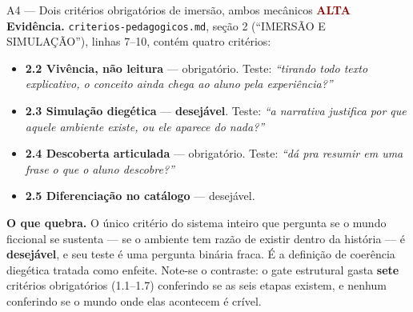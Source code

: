 \documentclass[11pt,a4paper]{article}
\newcommand{\sevalta}{\textcolor{DarkRed}{\textbf{ALTA}}}
\begin{document}
\begin{achadobox}{A4 --- Dois crit\'erios obrigat\'orios de imers\~ao, ambos mec\^anicos \hfill \sevalta}
\textbf{Evid\^encia.} \texttt{criterios-pedagogicos.md}, se\c{c}\~ao 2 (``IMERS\~AO E
SIMULA\c{C}\~AO''), linhas 7--10, cont\'em quatro crit\'erios:

\begin{itemize}
  \item \textbf{2.2 Viv\^encia, n\~ao leitura} --- obrigat\'orio. Teste: \emph{``tirando todo
        texto explicativo, o conceito ainda chega ao aluno pela experi\^encia?''}
  \item \textbf{2.3 Simula\c{c}\~ao diegética} --- \textbf{desej\'avel}. Teste: \emph{``a
        narrativa justifica por que aquele ambiente existe, ou ele aparece do nada?''}
  \item \textbf{2.4 Descoberta articulada} --- obrigat\'orio. Teste: \emph{``d\'a pra resumir em
        uma frase o que o aluno descobre?''}
  \item \textbf{2.5 Diferencia\c{c}\~ao no cat\'alogo} --- desej\'avel.
\end{itemize}

\textbf{O que quebra.} O \'unico crit\'erio do sistema inteiro que pergunta se o mundo ficcional
se sustenta --- se o ambiente tem raz\~ao de existir dentro da hist\'oria --- \'e
\textbf{desej\'avel}, e seu teste \'e uma pergunta bin\'aria fraca. \'E a defini\c{c}\~ao de
coer\^encia diegética tratada como enfeite. Note-se o contraste: o gate estrutural gasta
\textbf{sete} crit\'erios obrigat\'orios (1.1--1.7) conferindo se as seis etapas existem, e nenhum
conferindo se o mundo onde elas acontecem \'e cr\'ivel.
\end{achadobox}
\end{document}
